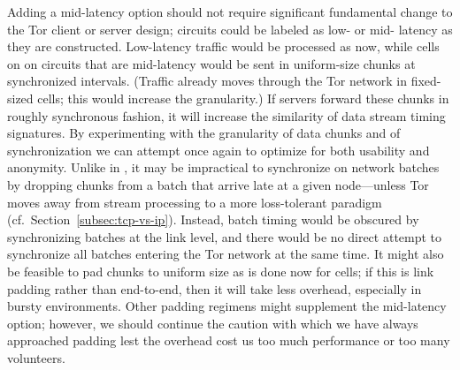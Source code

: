 \documentclass{llncs}
\begin{document}
Adding a mid-latency option should not require significant fundamental
change to the Tor client or server design; circuits could be labeled as
low- or mid- latency as they are constructed. Low-latency traffic
would be processed as now, while cells on on circuits that are mid-latency
would be sent in uniform-size chunks at synchronized intervals.  (Traffic
already moves through the Tor network in fixed-sized cells; this would
increase the granularity.)  If servers forward these chunks in roughly
synchronous  fashion, it will increase the similarity of data stream timing
signatures. By experimenting with the granularity of data chunks and
of synchronization we can attempt once again to optimize for both
usability and anonymity. Unlike in \cite{sync-batching}, it may be
impractical to synchronize on network batches by dropping chunks from
a batch that arrive late at a given node---unless Tor moves away from
stream processing to a more loss-tolerant paradigm (cf.\
Section~\ref{subsec:tcp-vs-ip}). Instead, batch timing would be obscured by
synchronizing batches at the link level, and there would
be no direct attempt to synchronize all batches
entering the Tor network at the same time.
It might also be feasible to
pad chunks to uniform size as is done now for cells; if this is link
padding rather than end-to-end, then it will take less overhead,
especially in bursty environments.
Other padding regimens might supplement the
mid-latency option; however, we should continue the caution with which
we have always approached padding lest the overhead cost us too much
performance or too many volunteers.
\end{document}
